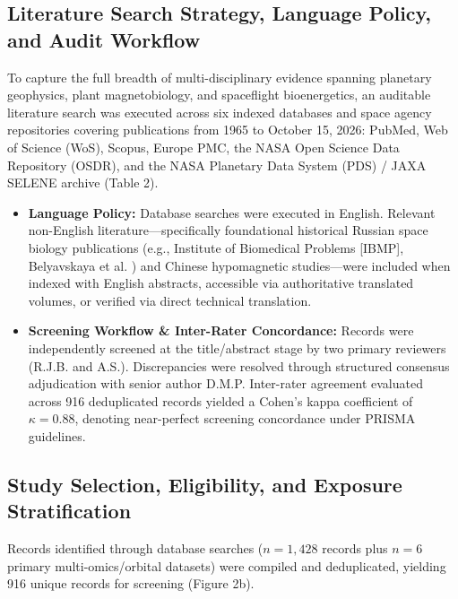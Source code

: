 \documentclass[default,sn-nature,iicol]{sn-jnl}
\begin{document}
\subsection{Literature Search Strategy, Language Policy, and Audit Workflow}
To capture the full breadth of multi-disciplinary evidence spanning planetary geophysics, plant magnetobiology, and spaceflight bioenergetics, an auditable literature search was executed across six indexed databases and space agency repositories covering publications from 1965 to October 15, 2026: PubMed, Web of Science (WoS), Scopus, Europe PMC, the NASA Open Science Data Repository (OSDR), and the NASA Planetary Data System (PDS) / JAXA SELENE archive (Table 2).





\begin{itemize}
\item \textbf{Language Policy:} Database searches were executed in English. Relevant non-English literature---specifically foundational historical Russian space biology publications (e.g., Institute of Biomedical Problems [IBMP], Belyavskaya et al. \cite{ref26,ref38}) and Chinese hypomagnetic studies---were included when indexed with English abstracts, accessible via authoritative translated volumes, or verified via direct technical translation.
\item \textbf{Screening Workflow \& Inter-Rater Concordance:} Records were independently screened at the title/abstract stage by two primary reviewers (R.J.B. and A.S.). Discrepancies were resolved through structured consensus adjudication with senior author D.M.P. Inter-rater agreement evaluated across 916 deduplicated records yielded a Cohen's kappa coefficient of $\kappa = 0.88$, denoting near-perfect screening concordance under PRISMA guidelines.
\end{itemize}


\subsection{Study Selection, Eligibility, and Exposure Stratification}
Records identified through database searches ($n = 1,428$ records plus $n = 6$ primary multi-omics/orbital datasets) were compiled and deduplicated, yielding 916 unique records for screening (Figure 2b). 
\end{document}
